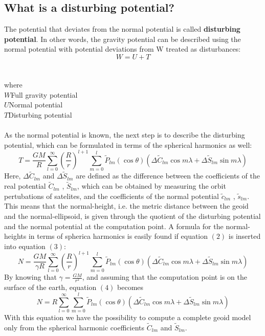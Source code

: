 \documentclass[a4paper,12pt]{report}
\newcommand\tab[1][1cm]{\hspace*{#1}}
\begin{document}
\subsection{What is a disturbing potential?}
The potential that deviates from the normal potential is called \textbf{disturbing potential}. In other words, the gravity potential can be described using the normal potential with
potential deviations from W treated as disturbances:
\begin{equation} 
W=U+T
\end{equation}
\\\\where
\\$W$\tab Full gravity potential
\\$U$\tab Normal potential
\\$T$\tab Disturbing potential
\\\\As the normal potential is known, the next step is to describe the disturbing potential, which can be formulated in terms of the spherical harmonics as well:
\begin{equation}
T=\frac{GM}{R}\sum_{l=0}^{\infty} \left(\frac{R}{r}\right)^{l+1}\sum_{m=0}^{l} \widetilde{P}_{lm}(\cos\theta)(\Delta\widetilde{C}_{lm}\cos m\lambda + \Delta\widetilde{S}_{lm}\sin m\lambda)
\end{equation}
Here, $\Delta\widetilde{C}_{lm}$ and $\Delta\widetilde{S}_{lm}$ are defined as the difference between the coefficients of the real potential $\widetilde{C}_{lm}$ , $\widetilde{S}_{lm}$, which can be obtained by measuring the orbit pertubations of satelites, and the coefficients of the normal potential $\widetilde{c}_{lm}$ , $	\widetilde{s}_{lm}$.
This means that the normal-height, i.e. the metric distance between the geoid and
the normal-ellipsoid, is given through the quotient of the disturbing potential and the
normal potential at the computation point. A formula for the normal-heights in terms
of spherica harmonics is easily found if equation $(2)$ is inserted into equation $(3)$:
\begin{equation}
N=\frac{GM}{\gamma R}\sum_{l=0}^{\infty} \left(\frac{R}{r}\right)^{l+1}\sum_{m=0}^{l} \widetilde{P}_{lm}(\cos\theta)(\Delta\widetilde{C}_{lm}\cos m\lambda + \Delta\widetilde{S}_{lm}\sin m\lambda)
\end{equation}
By knowing that $\gamma=\frac{GM}{r^2}$, and assuming that the computation point is on the surface of the earth, equation $(4)$ becomes
\begin{equation}
N=R\sum_{l=0}^{\infty}\sum_{m=0}^{l} \widetilde{P}_{lm}(\cos\theta)(\Delta\widetilde{C}_{lm}\cos m\lambda + \Delta\widetilde{S}_{lm}\sin m\lambda)
\end{equation}
With this equation we have the possibility to compute a complete geoid model only from
the spherical harmonic coefficients $\widetilde{C}_{lm}$ and $\widetilde{S}_{lm}$.\\\\\\
\end{document}

